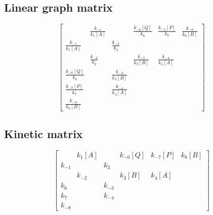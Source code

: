 \documentclass{article}%
\begin{document}
%
\subsection{Linear graph matrix}%
\label{subsec:Linear graph matrix}%
\[%
\begin{bmatrix}%
&\frac{k_{-1}}{k_{1}[A]}&&\frac{k_{-6}[Q]}{k_{6}}&\frac{k_{-7}[P]}{k_{7}}&\frac{k_{-8}}{k_{8}[B]}\\%
\frac{k_{-1}}{k_{1}[A]}&&\frac{k_{-2}}{k_{2}}&&&\\%
&\frac{k_{-2}}{k_{2}}&&\frac{k_{-3}}{k_{3}[B]}&\frac{k_{-4}}{k_{4}[A]}&\\%
\frac{k_{-6}[Q]}{k_{6}}&&\frac{k_{-3}}{k_{3}[B]}&&&\\%
\frac{k_{-7}[P]}{k_{7}}&&\frac{k_{-4}}{k_{4}[A]}&&&\\%
\frac{k_{-8}}{k_{8}[B]}&&&&&%
\end{bmatrix}%
\]

%
\subsection{Kinetic matrix}%
\label{subsec:Kinetic matrix}%
\[%
\begin{bmatrix}%
&k_{1}[A]&&k_{-6}[Q]&k_{-7}[P]&k_{8}[B]\\%
k_{-1}&&k_{2}&&&\\%
&k_{-2}&&k_{3}[B]&k_{4}[A]&\\%
k_{6}&&k_{-3}&&&\\%
k_{7}&&k_{-4}&&&\\%
k_{-8}&&&&&%
\end{bmatrix}%
\]

%
\end{document}
